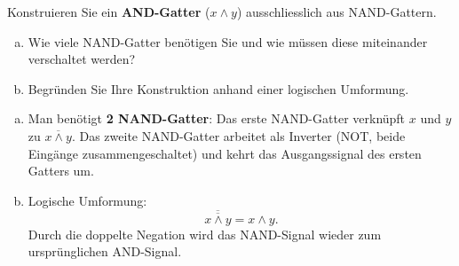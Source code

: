 \begin{mychallenge}\label{myexercise:nand-and}
    Konstruieren Sie ein \textbf{AND-Gatter} ($x \wedge y$) ausschliesslich aus NAND-Gattern.
    \begin{enumerate}[(a)]
        \item Wie viele NAND-Gatter benötigen Sie und wie müssen diese miteinander verschaltet werden?
        \item Begründen Sie Ihre Konstruktion anhand einer logischen Umformung.
    \end{enumerate}
    \begin{myanswer}
        \begin{enumerate}[(a)]
            \item Man benötigt \textbf{2 NAND-Gatter}: Das erste NAND-Gatter verknüpft $x$ und $y$ zu $\overline{x \wedge y}$. Das zweite NAND-Gatter arbeitet als Inverter (NOT, beide Eingänge zusammengeschaltet) und kehrt das Ausgangssignal des ersten Gatters um.
            \item Logische Umformung:
            \[
                \overline{\overline{x \wedge y}} = x \wedge y.
            \]
            Durch die doppelte Negation wird das NAND-Signal wieder zum ursprünglichen AND-Signal.
        \end{enumerate}
    \end{myanswer}
\end{mychallenge}

